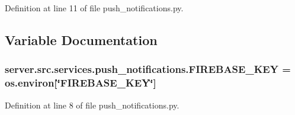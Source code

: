 Definition at line 11 of file push\+\_\+notifications.\+py.



\subsection{Variable Documentation}
\subsubsection[{\texorpdfstring{F\+I\+R\+E\+B\+A\+S\+E\+\_\+\+K\+EY}{FIREBASE_KEY}}]{\setlength{\rightskip}{0pt plus 5cm}server.\+src.\+services.\+push\+\_\+notifications.\+F\+I\+R\+E\+B\+A\+S\+E\+\_\+\+K\+EY = os.\+environ\mbox{[}\char`\"{}F\+I\+R\+E\+B\+A\+S\+E\+\_\+\+K\+EY\char`\"{}\mbox{]}}\hypertarget{namespaceserver_1_1src_1_1services_1_1push__notifications_a7af6f0b0439ce1e2f0e702d4bcda26c3}{}\label{namespaceserver_1_1src_1_1services_1_1push__notifications_a7af6f0b0439ce1e2f0e702d4bcda26c3}


Definition at line 8 of file push\+\_\+notifications.\+py.

